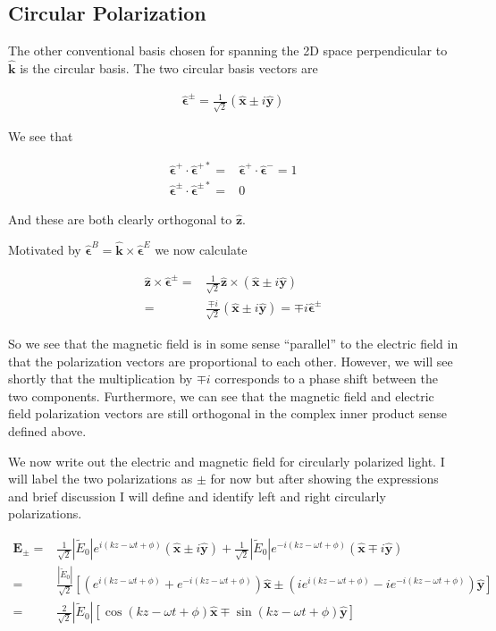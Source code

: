 \documentclass[12pt]{article}
\newcommand{\ep}{\epsilon}
\renewcommand{\vec}[1]{\boldsymbol{#1}}
\newcommand{\unitvec}[1]{\hat{\boldsymbol{#1}}}
\begin{document}
\subsection{Circular Polarization}

The other conventional basis chosen for spanning the 2D space perpendicular to $\unitvec{k}$ is the circular basis.
The two circular basis vectors are

\begin{align}
\unitvec{\ep}^{\pm} = \frac{1}{\sqrt{2}}(\unitvec{x} \pm i \unitvec{y})
\end{align}

We see that

\begin{align}
\unitvec{\ep}^+ \cdot \unitvec{\ep}^{+*} =& \unitvec{\ep}^+\cdot \unitvec{\ep}^- = 1\\
\unitvec{\ep}^{\pm} \cdot \unitvec{\ep}^{\pm*} =& 0
\end{align}

And these are both clearly orthogonal to $\unitvec{z}$.

Motivated by $\unitvec{\ep}^{B} = \unitvec{k} \times \unitvec{\ep}^E$ we now calculate

\begin{align}
\unitvec{z} \times \unitvec{\ep}^{\pm} =& \frac{1}{\sqrt{2}}\unitvec{z}\times(\unitvec{x} \pm i \unitvec{y})\\
=&\frac{\mp i}{\sqrt{2}}(\unitvec{x} \pm i\unitvec{y}) = \mp i \unitvec{\ep}^{\pm}
\end{align}

So we see that the magnetic field is in some sense ``parallel'' to the electric field in that the polarization vectors are proportional to each other.
However, we will see shortly that the multiplication by $\mp i$ corresponds to a phase shift between the two components.
Furthermore, we can see that the magnetic field and electric field polarization vectors are still orthogonal in the complex inner product sense defined above.

We now write out the electric and magnetic field for circularly polarized light.
I will label the two polarizations as $\pm$ for now but after showing the expressions and brief discussion I will define and identify left and right circularly polarizations.

\begin{align}
\vec{E}_{\pm} =& \frac{1}{\sqrt{2}} |\tilde{E}_0| e^{i(kz-\omega t + \phi)}(\unitvec{x} \pm i\unitvec{y}) + \frac{1}{\sqrt{2}} |\tilde{E}_0| e^{-i(kz-\omega t + \phi)}(\unitvec{x} \mp i\unitvec{y})\\
=& \frac{|\tilde{E}_0|}{\sqrt{2}} \left[\left(e^{i(kz-\omega t + \phi)} + e^{-i(kz-\omega t + \phi)} \right)\unitvec{x} \pm \left(ie^{i(kz-\omega t + \phi)} - ie^{-i(kz-\omega t + \phi)}\right)\unitvec{y}\right]\\
=& \frac{2}{\sqrt{2}}|\tilde{E}_0|\left[\cos(kz-\omega t + \phi)\unitvec{x} \mp \sin(kz-\omega t + \phi)\unitvec{y}\right]
\end{align}
\end{document}
